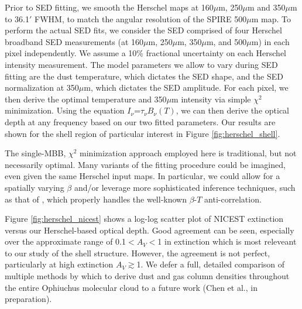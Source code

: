 \documentclass[11pt,a4paper]{emulateapj}
\begin{document}
Prior to SED fitting, we smooth the Herschel maps at 160$\mu$m, 250$\mu$m and 350$\mu$m to 36.1$'$ FWHM, to match the angular resolution of the SPIRE 500$\mu$m map. To perform the actual SED fits, we consider the SED comprised of four Herschel broadband SED measurements (at 160$\mu$m, 250$\mu$m, 350$\mu$m, and 500$\mu$m) in each pixel independently. We assume a 10\% fractional uncertainty on each Herschel intensity measurement. The model parameters we allow to vary during SED fitting are the dust temperature, which dictates the SED shape, and the SED normalization at 350$\mu$m, which dictates the SED amplitude. For each pixel, we then derive the optimal temperature and 350$\mu$m intensity via simple $\chi^2$ minimization. Using the equation $I_{\nu}$=$\tau_{\nu}$$B_{\nu}(T)$, we can then derive the optical depth at any frequency based on our two fitted parameters. Our results are shown for the shell region of particular interest in Figure \ref{fig:herschel_shell}.

The single-MBB, $\chi^2$ minimization approach employed here is traditional, but not necessarily optimal. Many variants of the fitting procedure could be imagined, even given the same Herschel input maps. In particular, we could allow for a spatially varying $\beta$ and/or leverage more sophisticated inference techniques, such as that of \cite{Kelly_2012}, which properly handles the well-known $\beta$-$T$ anti-correlation. 

Figure \ref{fig:herschel_nicest} shows a log-log scatter plot of NICEST extinction versus our Herschel-based optical depth. Good agreement can be seen, especially over the
approximate range of 0.1$<$$A_V$$<$1 in extinction which is most releveant to our study of the shell structure. However, the agreement is not perfect, particularly at high extinction $A_V$$\gtrsim$1. We defer a full, detailed comparison of multiple methods by which to derive dust and gas column densities throughout the entire Ophiuchus molecular cloud to a future work (Chen et al., in preparation).
\end{document}
